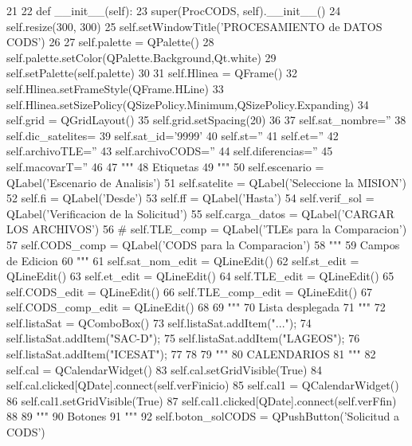 \begin{DoxyCode}
21 
22     def __init__(self):
23         super(ProcCODS, self).__init__()
24         self.resize(300, 300)
25         self.setWindowTitle('PROCESAMIENTO de DATOS CODS')
26        
27         self.palette = QPalette()
28         self.palette.setColor(QPalette.Background,Qt.white)
29         self.setPalette(self.palette)
30         
31         self.Hlinea = QFrame()
32         self.Hlinea.setFrameStyle(QFrame.HLine)
33         self.Hlinea.setSizePolicy(QSizePolicy.Minimum,QSizePolicy.Expanding)
34         self.grid   = QGridLayout()
35         self.grid.setSpacing(20)
36              
37         self.sat_nombre=''
38         self.dic_satelites={}
39         self.sat_id='9999'       
40         self.st=''
41         self.et=''
42         self.archivoTLE='' 
43         self.archivoCODS=''
44         self.diferencias=''
45         self.macovarT=''
46     
47         """
48         Etiquetas
49         """
50         self.escenario       = QLabel('Escenario de Analisis')
51         self.satelite        = QLabel('Seleccione la MISION')
52         self.fi              = QLabel('Desde')
53         self.ff              = QLabel('Hasta')
54         self.verif_sol       = QLabel('Verificacion de la Solicitud')
55         self.carga_datos     = QLabel('CARGAR LOS ARCHIVOS')
56 #         self.TLE_comp        = QLabel('TLEs para la Comparacion')
57         self.CODS_comp       = QLabel('CODS para la Comparacion')
58         """
59         Campos de Edicion
60         """
61         self.sat_nom_edit   = QLineEdit()
62         self.st_edit        = QLineEdit()
63         self.et_edit        = QLineEdit()
64         self.TLE_edit       = QLineEdit()
65         self.CODS_edit      = QLineEdit()
66         self.TLE_comp_edit  = QLineEdit()
67         self.CODS_comp_edit = QLineEdit()
68         
69         """
70         Lista desplegada
71         """
72         self.listaSat       = QComboBox()
73         self.listaSat.addItem("...");
74         self.listaSat.addItem("SAC-D"); 
75         self.listaSat.addItem("LAGEOS");
76         self.listaSat.addItem("ICESAT");
77 
78         
79         """
80         CALENDARIOS
81         """
82         self.cal = QCalendarWidget()
83         self.cal.setGridVisible(True)
84         self.cal.clicked[QDate].connect(self.verFinicio)
85         self.cal1 = QCalendarWidget()
86         self.cal1.setGridVisible(True)
87         self.cal1.clicked[QDate].connect(self.verFfin)
88                 
89         """
90         Botones
91         """
92         self.boton_solCODS      = QPushButton('Solicitud a CODS')

\end{DoxyCode}
